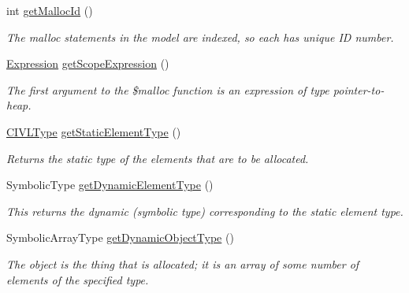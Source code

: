 \begin{DoxyCompactItemize}
\item 
int \hyperlink{classedu_1_1udel_1_1cis_1_1vsl_1_1civl_1_1model_1_1common_1_1statement_1_1CommonMallocStatement_a957b210a72b5b2b2a9d204f876e93837}{get\+Malloc\+Id} ()
\begin{DoxyCompactList}\small\item\em The malloc statements in the model are indexed, so each has unique I\+D number. \end{DoxyCompactList}\item 
\hyperlink{interfaceedu_1_1udel_1_1cis_1_1vsl_1_1civl_1_1model_1_1IF_1_1expression_1_1Expression}{Expression} \hyperlink{classedu_1_1udel_1_1cis_1_1vsl_1_1civl_1_1model_1_1common_1_1statement_1_1CommonMallocStatement_a2230bc67a6731665b833243bb1889545}{get\+Scope\+Expression} ()
\begin{DoxyCompactList}\small\item\em The first argument to the \$malloc function is an expression of type pointer-\/to-\/heap. \end{DoxyCompactList}\item 
\hyperlink{interfaceedu_1_1udel_1_1cis_1_1vsl_1_1civl_1_1model_1_1IF_1_1type_1_1CIVLType}{C\+I\+V\+L\+Type} \hyperlink{classedu_1_1udel_1_1cis_1_1vsl_1_1civl_1_1model_1_1common_1_1statement_1_1CommonMallocStatement_a0728e0ad13f5a6e5728c2aa8a2f9d06c}{get\+Static\+Element\+Type} ()
\begin{DoxyCompactList}\small\item\em Returns the static type of the elements that are to be allocated. \end{DoxyCompactList}\item 
Symbolic\+Type \hyperlink{classedu_1_1udel_1_1cis_1_1vsl_1_1civl_1_1model_1_1common_1_1statement_1_1CommonMallocStatement_a7511914ceafa7f42e33c238715a87a1a}{get\+Dynamic\+Element\+Type} ()
\begin{DoxyCompactList}\small\item\em This returns the dynamic (symbolic type) corresponding to the static element type. \end{DoxyCompactList}\item 
Symbolic\+Array\+Type \hyperlink{classedu_1_1udel_1_1cis_1_1vsl_1_1civl_1_1model_1_1common_1_1statement_1_1CommonMallocStatement_a2a0a10a21a066972181d84491e8371b2}{get\+Dynamic\+Object\+Type} ()
\begin{DoxyCompactList}\small\item\em The object is the thing that is allocated; it is an array of some number of elements of the specified type. \end{DoxyCompactList}\item 

\end{DoxyCompactItemize}
